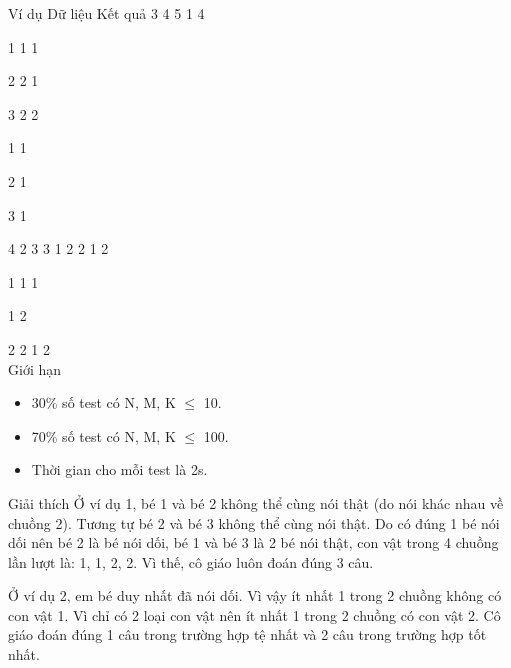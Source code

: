 Ví dụ
Dữ liệu                   Kết quả                   3 4 5 1 4         

           1 1 1          

           2 2 1          

           3 2 2          

           1 1          

           2 1          

           3 1          

           4 2                    3 3                   1 2 2 1 2         

           1 1 1          

           1 2          

           2 2                    1 2         
\\
Giới hạn
\begin{itemize}
	\item        30\% số test có    N, M, K  $\le$  10.      
	\item        70\% số test có    N, M, K  $\le$  100.      
	\item        Thời gian cho    mỗi test là 2s.      
\end{itemize}
Giải thích
Ở ví dụ 1, bé 1 và bé  2 không thể cùng nói thật (do nói khác nhau về chuồng 2).  Tương tự bé 2 và bé 3 không thể cùng nói thật. Do có  đúng 1 bé nói dối nên bé 2 là bé nói dối, bé 1 và bé  3 là 2 bé nói thật, con vật trong 4 chuồng lần lượt là:  1, 1, 2, 2. Vì thế, cô giáo luôn đoán đúng 3 câu.     

      Ở ví dụ 2, em bé duy  nhất đã nói dối. Vì vậy ít nhất 1 trong 2 chuồng không  có con vật 1. Vì chỉ có 2 loại con vật nên ít nhất 1  trong 2 chuồng có con vật 2. Cô giáo đoán đúng 1 câu trong  trường hợp tệ nhất và 2 câu trong trường hợp tốt nhất.